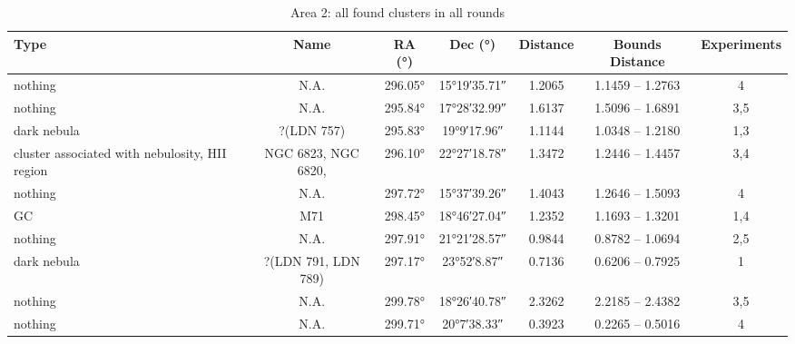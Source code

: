 \begin{table}[H]
    \centering
    \caption{Area 2: all found clusters in all rounds}
    \label{tb:results-raw-a2}
    \begin{tabular}{l c c c c c c }
        \toprule
        Type                                           & Name                & RA (°)       & Dec (°)            & Distance & Bounds Distance  & Experiments \\
        \midrule
        nothing                                        & N.A.                & \ang{296.05} & \ang{+15;19;35.71} & 1.2065   & 1.1459 -- 1.2763 & 4           \\ %
        nothing                                        & N.A.                & \ang{295.84} & \ang{+17;28;32.99} & 1.6137   & 1.5096 -- 1.6891 & 3,5         \\ %
        dark nebula                                    & ?(LDN 757)          & \ang{295.83} & \ang{+19;9;17.96}  & 1.1144   & 1.0348 -- 1.2180 & 1,3         \\ %
        cluster associated with nebulosity, HII region & NGC 6823, NGC 6820, & \ang{296.10} & \ang{+22;27;18.78} & 1.3472   & 1.2446 -- 1.4457 & 3,4         \\ %
        nothing                                        & N.A.                & \ang{297.72} & \ang{+15;37;39.26} & 1.4043   & 1.2646 -- 1.5093 & 4           \\ %
        GC                                             & M71                 & \ang{298.45} & \ang{+18;46;27.04} & 1.2352   & 1.1693 -- 1.3201 & 1,4         \\ %
        nothing                                        & N.A.                & \ang{297.91} & \ang{+21;21;28.57} & 0.9844   & 0.8782 -- 1.0694 & 2,5         \\ %
        dark nebula                                    & ?(LDN 791, LDN 789) & \ang{297.17} & \ang{+23;52;8.87}  & 0.7136   & 0.6206 -- 0.7925 & 1           \\ %
        nothing                                        & N.A.                & \ang{299.78} & \ang{+18;26;40.78} & 2.3262   & 2.2185 -- 2.4382 & 3,5         \\ %
        nothing                                        & N.A.                & \ang{299.71} & \ang{+20;7;38.33}  & 0.3923   & 0.2265 -- 0.5016 & 4           \\ %

\end{tabular}
\end{table}
